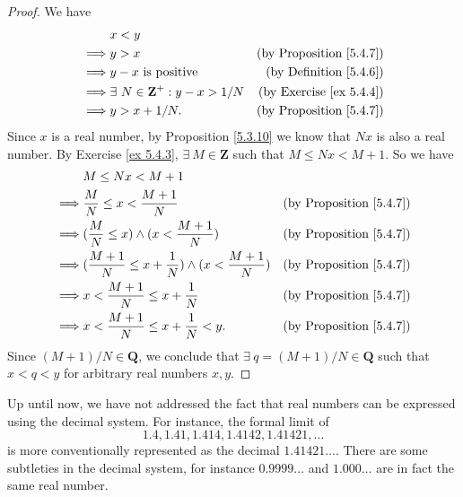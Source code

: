 \begin{proof}
    We have
    \begin{align*}
                 & x < y                                                                             \\
        \implies & y > x                                       & \text{(by Proposition \ref{5.4.7})} \\
        \implies & y - x \text{ is positive}                   & \text{(by Definition \ref{5.4.6})}  \\
        \implies & \exists\ N \in \mathbf{Z}^+ : y - x > 1 / N & \text{(by Exercise \ref{ex 5.4.4})} \\
        \implies & y > x + 1 / N.                              & \text{(by Proposition \ref{5.4.7})} \\
    \end{align*}
    Since \(x\) is a real number, by Proposition \ref{5.3.10} we know that \(Nx\) is also a real number.
    By Exercise \ref{ex 5.4.3}, \(\exists\ M \in \mathbf{Z}\) such that \(M \leq Nx < M + 1\).
    So we have
    \begin{align*}
                 & M \leq Nx < M + 1                                                                                        \\
        \implies & \frac{M}{N} \leq x < \frac{M + 1}{N}                               & \text{(by Proposition \ref{5.4.7})} \\
        \implies & (\frac{M}{N} \leq x) \land (x < \frac{M + 1}{N})                   & \text{(by Proposition \ref{5.4.7})} \\
        \implies & (\frac{M + 1}{N} \leq x + \frac{1}{N}) \land (x < \frac{M + 1}{N}) & \text{(by Proposition \ref{5.4.7})} \\
        \implies & x < \frac{M + 1}{N} \leq x + \frac{1}{N}                           & \text{(by Proposition \ref{5.4.7})} \\
        \implies & x < \frac{M + 1}{N} \leq x + \frac{1}{N} < y.                      & \text{(by Proposition \ref{5.4.7})}
    \end{align*}
    Since \((M + 1) / N \in \mathbf{Q}\), we conclude that \(\exists\ q = (M + 1) / N \in \mathbf{Q}\) such that \(x < q < y\) for arbitrary real numbers \(x, y\).
\end{proof}

\begin{remark}\label{5.4.15}
    Up until now, we have not addressed the fact that real numbers can be expressed using the decimal system.
    For instance, the formal limit of
    \[
        1.4, 1.41, 1.414, 1.4142, 1.41421, \dots
    \]
    is more conventionally represented as the decimal \(1.41421\dots\).
    There are some subtleties in the decimal system, for instance \(0.9999\dots\) and \(1.000\dots\) are in fact the same real number.
\end{remark}

